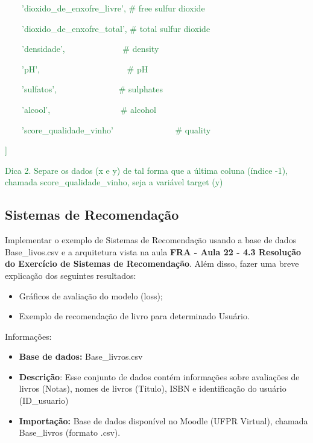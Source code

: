 \textcolor[HTML]{188038}{\ \ \ \ {}'dioxido\_de\_enxofre\_livre', \# free sulfur dioxide}

\textcolor[HTML]{188038}{\ \ \ \ {}'dioxido\_de\_enxofre\_total', \# total sulfur dioxide}

\textcolor[HTML]{188038}{\ \ \ \ {}'densidade', \ \ \ \ \ \ \ \ \ \ \ \ \ \# density}

\textcolor[HTML]{188038}{\ \ \ \ {}'pH', \ \ \ \ \ \ \ \ \ \ \ \ \ \ \ \ \ \ \ \ \# pH}

\textcolor[HTML]{188038}{\ \ \ \ {}'sulfatos', \ \ \ \ \ \ \ \ \ \ \ \ \ \ \# sulphates}

\textcolor[HTML]{188038}{\ \ \ \ {}'alcool', \ \ \ \ \ \ \ \ \ \ \ \ \ \ \ \ \# alcohol}

\textcolor[HTML]{188038}{\ \ \ \ {}'score\_qualidade\_vinho' \ \ \ \ \ \ \ \ \ \ \ \ \ \ \# quality}

\textcolor[HTML]{188038}{]}


\textcolor[HTML]{188038}{Dica 2. Separe os dados (x e y) de tal forma que a última coluna (índice -1), chamada
score\_qualidade\_vinho, seja a variável target (y)}


\subsection{Sistemas de Recomendação}


Implementar o exemplo de Sistemas de Recomendação usando a base de dados Base\_livos.csv e a arquitetura vista na aula
\textbf{FRA - Aula 22 - 4.3 Resolução do Exercício de Sistemas de Recomendação}. Além disso, fazer uma breve explicação
dos seguintes resultados:

\begin{itemize}[series=listWWNumxv,label=${\bullet}$]
\item Gráficos de avaliação do modelo (loss);
\item Exemplo de recomendação de livro para determinado Usuário.
\end{itemize}
Informações:

\begin{itemize}[series=listWWNumxvii,label=${\bullet}$]
\item \textbf{Base de dados: }Base\_livros.csv
\item \textbf{Descrição}: Esse conjunto de dados contém informações sobre avaliações de livros (Notas), nomes de livros
(Titulo), ISBN e identificação do usuário (ID\_usuario)
\item \textbf{Importação: }Base de dados disponível no Moodle (UFPR Virtual), chamada Base\_livros (formato .csv).
\end{itemize}

